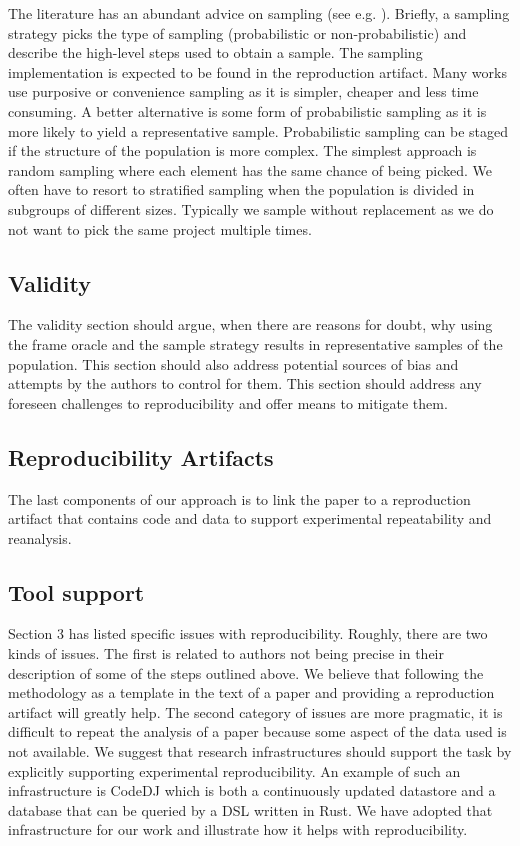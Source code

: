 \documentclass[sigconf,review,anonymous]{acmart}
\renewcommand{\dj}{{\textsf{Code{\small{DJ}}}}\xspace}
\begin{document}
The literature has an abundant advice on sampling (see e.g.
\cite{Lohr:2010:Sampling}). Briefly, a sampling strategy picks the type of
sampling (probabilistic or non-probabilistic) and describe the high-level steps
used to obtain a sample. The sampling implementation is expected to be found in
the reproduction artifact. Many works use purposive or convenience sampling as
it is simpler, cheaper and less time consuming. A better alternative is some
form of probabilistic sampling as it is more likely to yield a representative
sample. Probabilistic sampling can be staged if the structure of the population
is more complex. The simplest approach is random sampling where each element has
the same chance of being picked. We often have to resort to stratified sampling
when the population is divided in subgroups of different sizes. Typically we
sample without replacement as we do not want to pick the same project multiple
times.

\subsection{Validity}

The validity section should argue, when there are reasons for doubt, why using
the frame oracle and the sample strategy results in representative samples of
the population. This section should also address potential sources of bias and
attempts by the authors to control for them. This section should address any
foreseen challenges to reproducibility and offer means to mitigate them.

\subsection{Reproducibility Artifacts}

The last components of our approach is to link the paper to a reproduction
artifact that contains code and data to support experimental repeatability and
reanalysis.

\subsection{Tool support}

Section 3 has listed specific issues with reproducibility. Roughly, there are
two kinds of issues. The first is related to authors not being precise in their
description of some of the steps outlined above. We believe that following the
methodology as a template in the text of a paper and providing a reproduction
artifact will greatly help. The second category of issues are more pragmatic, it
is difficult to repeat the analysis of a paper because some aspect of the data
used is not available. We suggest that research infrastructures should support
the task by explicitly supporting experimental reproducibility. An example of
such an infrastructure is \dj which is both a continuously updated datastore and
a database that can be queried by a DSL written in Rust. We have adopted that
infrastructure for our work and illustrate how it helps with reproducibility.
\end{document}
